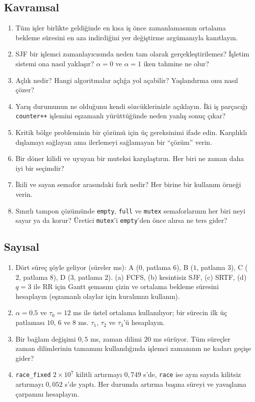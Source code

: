 \documentclass[11pt,a4paper]{article}
\begin{document}
\subsection*{Kavramsal}
\begin{enumerate}[leftmargin=1.6em]
  \item Tüm işler birlikte geldiğinde en kısa iş önce zamanlamasının ortalama bekleme süresini en aza indirdiğini yer değiştirme argümanıyla kanıtlayın.
  \item SJF bir işlemci zamanlayıcısında neden tam olarak gerçekleştirilemez? İşletim sistemi ona nasıl yaklaşır? $\alpha = 0$ ve $\alpha = 1$ iken tahmine ne olur?
  \item Açlık nedir? Hangi algoritmalar açlığa yol açabilir? Yaşlandırma onu nasıl çözer?
  \item Yarış durumunun ne olduğunu kendi sözcüklerinizle açıklayın. İki iş parçacığı \texttt{counter++} işlemini eşzamanlı yürüttüğünde neden yanlış sonuç çıkar?
  \item Kritik bölge probleminin bir çözümü için üç gereksinimi ifade edin. Karşılıklı dışlamayı sağlayan ama ilerlemeyi sağlamayan bir ``çözüm'' verin.
  \item Bir döner kilidi ve uyuyan bir muteksi karşılaştırın. Her biri ne zaman daha iyi bir seçimdir?
  \item İkili ve sayan semafor arasındaki fark nedir? Her birine bir kullanım örneği verin.
  \item Sınırlı tampon çözümünde \texttt{empty}, \texttt{full} ve \texttt{mutex} semaforlarının her biri neyi sayar ya da korur? Üretici \texttt{mutex}'i \texttt{empty}'den önce alırsa ne ters gider?
\end{enumerate}

\subsection*{Sayısal}
\begin{enumerate}[leftmargin=1.6em,resume]
  \item Dört süreç şöyle geliyor (süreler ms): A ($0$, patlama $6$), B ($1$, patlama $3$), C ($2$, patlama $8$), D ($3$, patlama $2$). (a) FCFS, (b) kesintisiz SJF, (c) SRTF, (d) $q=3$ ile RR için Gantt şemasını çizin ve ortalama bekleme süresini hesaplayın (eşzamanlı olaylar için kuralımızı kullanın).
  \item $\alpha = 0.5$ ve $\tau_0 = 12$ ms ile üstel ortalama kullanılıyor; bir sürecin ilk üç patlaması $10$, $6$ ve $8$ ms. $\tau_1$, $\tau_2$ ve $\tau_3$'ü hesaplayın.
  \item Bir bağlam değişimi $0{,}5$ ms, zaman dilimi $20$ ms sürüyor. Tüm süreçler zaman dilimlerinin tamamını kullandığında işlemci zamanının ne kadarı geçişe gider?
  \item \texttt{race\_fixed} $2\times10^{7}$ kilitli artırmayı $0{,}749$ s'de, \texttt{race} ise aynı sayıda kilitsiz artırmayı $0{,}052$ s'de yaptı. Her durumda artırma başına süreyi ve yavaşlama çarpanını hesaplayın.
\end{enumerate}
\end{document}
